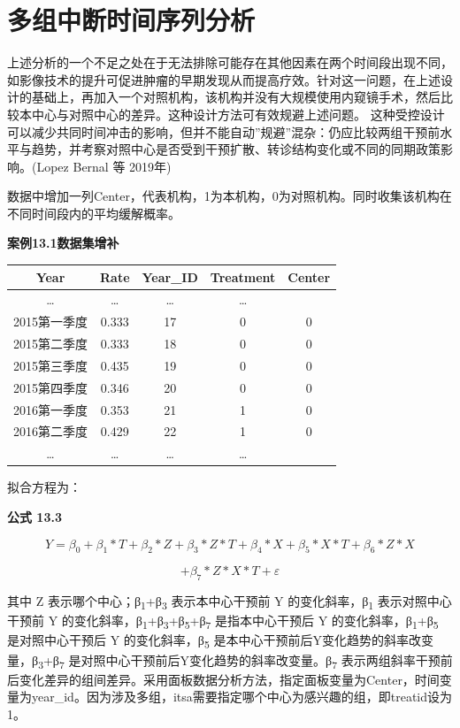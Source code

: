 \documentclass[
  chinese-hans,
  letterpaper,
  DIV=11,
  numbers=noendperiod]{scrreprt}
\newcounter{none} %
\begin{document}
\section{多组中断时间序列分析}\label{ux591aux7ec4ux4e2dux65adux65f6ux95f4ux5e8fux5217ux5206ux6790}

上述分析的一个不足之处在于无法排除可能存在其他因素在两个时间段出现不同，如影像技术的提升可促进肿瘤的早期发现从而提高疗效。针对这一问题，在上述设计的基础上，再加入一个对照机构，该机构并没有大规模使用内窥镜手术，然后比较本中心与对照中心的差异。这种设计方法可有效规避上述问题。
这种受控设计可以减少共同时间冲击的影响，但并不能自动''规避''混杂：仍应比较两组干预前水平与趋势，并考察对照中心是否受到干预扩散、转诊结构变化或不同的同期政策影响。(Lopez
Bernal 等 2019年)

数据中增加一列Center，代表机构，1为本机构，0为对照机构。同时收集该机构在不同时间段内的平均缓解概率。

\textbf{案例13.1数据集增补}

{\def\LTcaptype{none} %
\begin{longtable}[]{@{}ccccc@{}}
\toprule\noalign{}
Year & Rate & Year\_ID & Treatment & Center \\
\midrule\noalign{}
\endhead
\bottomrule\noalign{}
\endlastfoot
\ldots{} & \ldots{} & \ldots{} & \ldots{} & \\
2015第一季度 & 0.333 & 17 & 0 & 0 \\
2015第二季度 & 0.333 & 18 & 0 & 0 \\
2015第三季度 & 0.435 & 19 & 0 & 0 \\
2015第四季度 & 0.346 & 20 & 0 & 0 \\
2016第一季度 & 0.353 & 21 & 1 & 0 \\
2016第二季度 & 0.429 & 22 & 1 & 0 \\
\ldots{} & \ldots{} & \ldots{} & \ldots{} & \\
\end{longtable}
}

拟合方程为：

\textbf{公式 13.3}

\[Y = \beta_{0} + \beta_{1}*T + \beta_{2}*Z + \beta_{3}*Z*T + \beta_{4}*X + \beta_{5}*X*T + \beta_{6}*Z*X\]

\[+ \beta_{7}*Z*X*T + \varepsilon\]

其中 Z 表示哪个中心；β\textsubscript{1}+β\textsubscript{3}
表示本中心干预前 Y 的变化斜率，β\textsubscript{1} 表示对照中心干预前 Y
的变化斜率，β\textsubscript{1}+β\textsubscript{3}+β\textsubscript{5}+β\textsubscript{7}
是指本中心干预后 Y 的变化斜率，β\textsubscript{1}+β\textsubscript{5}
是对照中心干预后 Y 的变化斜率，β\textsubscript{5}
是本中心干预前后Y变化趋势的斜率改变量，β\textsubscript{3}+β\textsubscript{7}
是对照中心干预前后Y变化趋势的斜率改变量。β\textsubscript{7}
表示两组斜率干预前后变化差异的组间差异。采用面板数据分析方法，指定面板变量为Center，时间变量为year\_id。因为涉及多组，itsa需要指定哪个中心为感兴趣的组，即treatid设为1。
\end{document}
